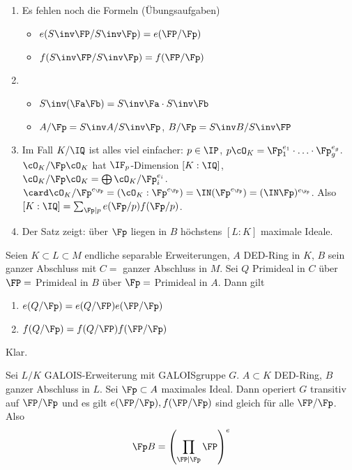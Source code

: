 \begin{Bemerkung}
 \begin{enumerate}
  \item Es fehlen noch die Formeln (Übungsaufgaben)
  \begin{itemize}
   \item $e(S\inv\FP/S\inv\Fp)=e(\FP/\Fp)$
   \item $f(S\inv\FP/S\inv\Fp)=f(\FP/\Fp)$
  \end{itemize}
  \item 
  \begin{itemize}
   \item $S\inv(\Fa\Fb)=S\inv\Fa \cdot S\inv \Fb$
   \item $A/\Fp=S\inv A/S\inv\Fp$, $B/\Fp=S\inv B/S\inv \FP$
  \end{itemize}
  \item Im Fall $K/\IQ$ ist alles viel einfacher: $p\in \IP$, $p\cO_K=\Fp_1^{e_1}\cdot\ldots\cdot \Fp_g^{e_g}$. $\cO_K/\Fp\cO_K$ hat $\IF_p$-Dimension $[K:\IQ]$, $\cO_K/\Fp\cO_K=\bigoplus \cO_K/\Fp_i^{e_i}$.
  $\card \cO_K/\Fp^{e_\Fp}=(\cO_K:\Fp^{e_\Fp})=\IN(\Fp^{e_\Fp})=(\IN\Fp)^{e_\Fp}$. Also $[K:\IQ]=\sum_{\Fp\mid p} e(\Fp/p) f(\Fp/p)$.
  \item Der Satz zeigt: über $\Fp$ liegen in $B$ höchstens $[L:K]$ maximale Ideale.
 \end{enumerate}
\end{Bemerkung}


\begin{Fakt}
 Seien $K\subset L\subset M$ endliche separable Erweiterungen, $A$ DED-Ring in $K$, $B$ sein ganzer Abschluss mit $C=$ ganzer Abschluss in $M$. Sei $Q$ Primideal in $C$ über $\FP=$ Primideal in $B$ über $\Fp=$ Primideal in $A$. Dann gilt
 \begin{enumerate}
  \item $e(Q/\Fp)=e(Q/\FP)e(\FP/\Fp)$
  \item $f(Q/\Fp)=f(Q/\FP)f(\FP/\Fp)$
 \end{enumerate}
\end{Fakt}

\begin{Beweis}
 Klar.
\end{Beweis}


\begin{Fakt}
 Sei $L/K$ GALOIS-Erweiterung mit GALOISgruppe $G$. $A\subset K$ DED-Ring, $B$ ganzer Abschluss in $L$. Sei $\Fp\subset A$ maximales Ideal. Dann operiert $G$ transitiv auf $\FP/\Fp$ und es gilt $e(\FP/\Fp), f(\FP/\Fp)$ sind gleich für alle $\FP/\Fp$. Also
 \[ \Fp B = \left( \prod_{\FP\mid\Fp} \FP\right)^e\]
\end{Fakt}

